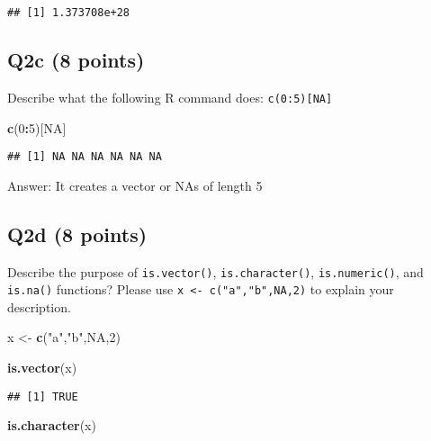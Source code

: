 \documentclass[
]{article}
\newenvironment{Shaded}{\begin{snugshade}}{\end{snugshade}}
\newcommand{\ConstantTok}[1]{\textcolor[rgb]{0.56,0.35,0.01}{#1}}
\newcommand{\DecValTok}[1]{\textcolor[rgb]{0.00,0.00,0.81}{#1}}
\newcommand{\FunctionTok}[1]{\textcolor[rgb]{0.13,0.29,0.53}{\textbf{#1}}}
\newcommand{\NormalTok}[1]{#1}
\newcommand{\OtherTok}[1]{\textcolor[rgb]{0.56,0.35,0.01}{#1}}
\newcommand{\SpecialCharTok}[1]{\textcolor[rgb]{0.81,0.36,0.00}{\textbf{#1}}}
\newcommand{\StringTok}[1]{\textcolor[rgb]{0.31,0.60,0.02}{#1}}
\begin{document}
\begin{verbatim}
## [1] 1.373708e+28
\end{verbatim}

\hypertarget{q2c-8-points}{%
\subsection{Q2c (8 points)}\label{q2c-8-points}}

Describe what the following R command does: \texttt{c(0:5){[}NA{]}}

\begin{Shaded}
\begin{Highlighting}[]
\FunctionTok{c}\NormalTok{(}\DecValTok{0}\SpecialCharTok{:}\DecValTok{5}\NormalTok{)[}\ConstantTok{NA}\NormalTok{]}
\end{Highlighting}
\end{Shaded}

\begin{verbatim}
## [1] NA NA NA NA NA NA
\end{verbatim}

Answer: It creates a vector or NAs of length 5

\hypertarget{q2d-8-points}{%
\subsection{Q2d (8 points)}\label{q2d-8-points}}

Describe the purpose of \texttt{is.vector()}, \texttt{is.character()},
\texttt{is.numeric()}, and \texttt{is.na()} functions? Please use
\texttt{x\ \textless{}-\ c("a","b",NA,2)} to explain your description.

\begin{Shaded}
\begin{Highlighting}[]
\NormalTok{x }\OtherTok{\textless{}{-}} \FunctionTok{c}\NormalTok{(}\StringTok{"a"}\NormalTok{,}\StringTok{"b"}\NormalTok{,}\ConstantTok{NA}\NormalTok{,}\DecValTok{2}\NormalTok{)}

\FunctionTok{is.vector}\NormalTok{(x)}
\end{Highlighting}
\end{Shaded}

\begin{verbatim}
## [1] TRUE
\end{verbatim}

\begin{Shaded}
\begin{Highlighting}[]
\FunctionTok{is.character}\NormalTok{(x)}
\end{Highlighting}
\end{Shaded}
\end{document}
